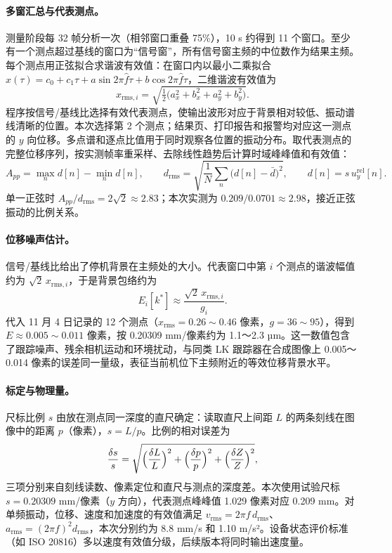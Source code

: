 \paragraph{多窗汇总与代表测点。}测量阶段每 32 帧分析一次（相邻窗口重叠 75\%），10 s 约得到 11 个窗口。至少有一个测点超过基线的窗口为“信号窗”，所有信号窗主频的中位数作为结果主频。每个测点用正弦拟合求谐波有效值：在窗口内以最小二乘拟合 $x(\tau)=c_0+c_1\tau+a\sin2\pi\hat f\tau+b\cos2\pi\hat f\tau$，二维谐波有效值为
\begin{equation}
x_{\mathrm{rms},i}=\sqrt{\tfrac12\bigl(a_x^2+b_x^2+a_y^2+b_y^2\bigr)} .
\end{equation}
程序按信号/基线比选择有效代表测点，使输出波形对应于背景相对较低、振动谱线清晰的位置。本次选择第 2 个测点；结果页、打印报告和报警均对应这一测点的 $y$ 向位移。多点谱和逐点比值用于同时观察各位置的振动分布。取代表测点的完整位移序列，按实测帧率重采样、去除线性趋势后计算时域峰峰值和有效值：
\begin{equation}
A_{pp}=\max_n d[n]-\min_n d[n],\qquad d_{\mathrm{rms}}=\sqrt{\frac1N\sum_n\bigl(d[n]-\bar d\bigr)^2},\qquad d[n]=s\,u^{\mathrm{rel}}_y[n] .
\end{equation}
单一正弦时 $A_{pp}/d_{\mathrm{rms}}=2\sqrt2\approx2.83$；本次实测为 $0.209/0.0701\approx2.98$，接近正弦振动的比例关系。

\paragraph{位移噪声估计。}\label{sec:noise}信号/基线比给出了停机背景在主频处的大小。代表窗口中第 $i$ 个测点的谐波幅值约为 $\sqrt2\,x_{\mathrm{rms},i}$，于是背景包络约为
\begin{equation}
E_i[k^*]\approx\frac{\sqrt2\,x_{\mathrm{rms},i}}{g_i} .
\end{equation}
代入 11 月 4 日记录的 12 个测点（$x_{\mathrm{rms}}=0.26\sim0.46$ 像素，$g=36\sim95$），得到 $E\approx0.005\sim0.011$ 像素，按 0.20309 mm/像素约为 1.1～2.3 µm。这一数值包含了跟踪噪声、残余相机运动和环境扰动，与同类 LK 跟踪器在合成图像上 0.005～0.014 像素的误差同一量级，表征当前机位下主频附近的等效位移背景水平。

\paragraph{标定与物理量。}尺标比例 $s$ 由放在测点同一深度的直尺确定：读取直尺上间距 $L$ 的两条刻线在图像中的距离 $p$（像素），$s=L/p$。比例的相对误差为
\begin{equation}
\frac{\delta s}{s}=\sqrt{\Bigl(\frac{\delta L}{L}\Bigr)^2+\Bigl(\frac{\delta p}{p}\Bigr)^2+\Bigl(\frac{\delta Z}{Z}\Bigr)^2},
\end{equation}
三项分别来自刻线读数、像素定位和直尺与测点的深度差。本次使用试验尺标 $s=0.20309$ mm/像素（$y$ 方向），代表测点峰峰值 1.029 像素对应 0.209 mm。对单频振动，位移、速度和加速度的有效值满足 $v_{\mathrm{rms}}=2\pi f\,d_{\mathrm{rms}}$、$a_{\mathrm{rms}}=(2\pi f)^2d_{\mathrm{rms}}$，本次分别约为 8.8 mm/s 和 1.10 m/s²。设备状态评价标准（如 ISO 20816）多以速度有效值分级\cite{iso20816}，后续版本将同时输出速度量。

